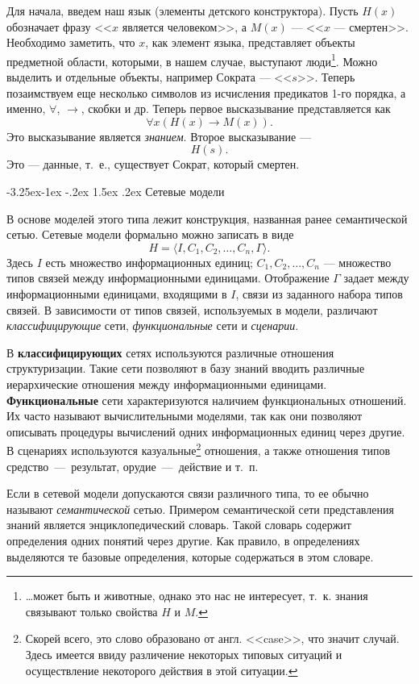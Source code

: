 \documentclass[12pt, openany, twoside]{book} %
\makeatletter
\renewcommand\subsection{\@startsection{subsection}{2}{\z@}%
                                     {-3.25ex\@plus -1ex \@minus -.2ex}%
                                     {1.5ex \@plus .2ex}%
                                     {\normalfont\normalsize\bfseries}}
\makeatother
\begin{document}
Для начала, введем наш язык (элементы детского конструктора). Пусть $H(x)$ обозначает фразу <<$x$ является человеком>>, а $M(x)$ --- <<$x$ --- смертен>>. Необходимо заметить, что $x$, как элемент языка, представляет объекты предметной области, которыми, в нашем случае, выступают люди\footnote{\ldots может быть и животные, однако это нас не интересует, т.~к. знания связывают только свойства $H$ и $M$.}. Можно выделить и отдельные объекты, например Сократа --- <<$s$>>. Теперь позаимствуем еще несколько символов из исчисления предикатов 1-го порядка, а именно, $\forall$, $\to$, скобки и др. Теперь первое высказывание представляется как
$$
\forall x \left(H(x)\to M(x)\right).
$$
Это высказывание является {\em знанием}. Второе высказывание ---
$$
H(s).
$$
Это --- данные, т.~е., существует Сократ, который смертен.

\subsection{Сетевые модели}

В основе моделей этого типа лежит конструкция, названная ранее семантической сетью. Сетевые модели формально можно записать в виде
$$
    H=\langle I, C_1, C_2, \ldots, C_n, \Gamma\rangle.
$$
Здесь $I$ есть множество информационных единиц; $C_1, C_2, \ldots, C_n$ --- множество типов связей между информационными единицами. Отображение $\Gamma$ задает между информационными единицами, входящими в $I$, связи из заданного набора типов связей. В зависимости от типов связей, используемых в модели, различают {\em классифицирующие} сети, {\em функциональные} сети и {\em сценарии}.

В {\bf классифицирующих} сетях используются различные отношения структуризации. Такие сети позволяют в базу знаний вводить различные иерархические отношения между информационными единицами. {\bf Функциональные} сети характеризуются наличием функциональных отношений. Их часто называют вычислительными моделями, так как они позволяют описывать процедуры вычислений одних информационных единиц через другие. В сценариях используются казуальные\footnote{Скорей всего, это слово образовано от англ. <<case>>, что значит случай. Здесь имеется ввиду различение некоторых типовых ситуаций и осуществление некоторого действия в этой ситуации.} отношения, а также отношения типов средство~---~результат, орудие~---~действие и т.~п.

Если в сетевой модели допускаются связи различного типа, то ее обычно называют {\em семантической} сетью. Примером семантической сети представления знаний является энциклопедический словарь. Такой словарь содержит определения одних понятий через другие. Как правило, в определениях выделяются те базовые определения, которые содержаться в этом словаре.
\end{document}
